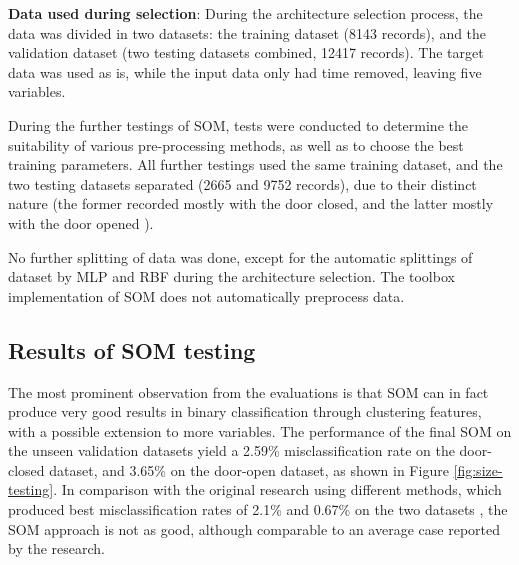 \documentclass[10pt, oneside]{article}
\begin{document}
\textbf{Data used during selection}: During the architecture selection process, the data was divided in two datasets: the training dataset (8143 records), and the validation dataset (two testing datasets combined, 12417 records). The target data was used as is, while the input data only had time removed, leaving five variables.

During the further testings of SOM, tests were conducted to determine the suitability of various pre-processing methods, as well as to choose the best training parameters. All further testings used the same training dataset, and the two testing datasets separated (2665 and 9752 records), due to their distinct nature (the former recorded mostly with the door closed, and the latter mostly with the door opened \cite[Tb. 5]{candanedo2016accurate}). 

No further splitting of data was done, except for the automatic splittings of dataset by MLP and RBF during the architecture selection. The toolbox implementation of SOM does not automatically preprocess data.

\subsection{Results of SOM testing}

The most prominent observation from the evaluations is that SOM can in fact produce very good results in binary classification through clustering features, with a possible extension to more variables. The performance of the final SOM on the unseen validation datasets yield a 2.59\% misclassification rate on the door-closed dataset, and 3.65\% on the door-open dataset, as shown in Figure \ref{fig:size-testing}. In comparison with the original research using different methods, which produced best misclassification rates of 2.1\% and 0.67\% on the two datasets \cite[p. 36]{candanedo2016accurate}, the SOM approach is not as good, although comparable to an average case reported by the research. 
\end{document}

